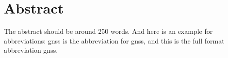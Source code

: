 \newpage
\thispagestyle{onlypagenum}	
\chapter*{Abstract}
The abstract should be around 250 words. And here is an example for abbreviations: \acrshort{gnss} is the abbreviation for \acrlong{gnss}, and this is the full format abbreviation \acrfull{gnss}. 

\lipsum[1-2]

\newpage
\thispagestyle{empty}
\cleardoublepage
\thispagestyle{empty}
